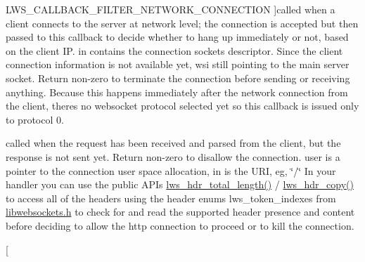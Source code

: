 \begin{Desc}
\begin{description}
{L\+W\+S\+\_\+\+C\+A\+L\+L\+B\+A\+C\+K\+\_\+\+F\+I\+L\+T\+E\+R\+\_\+\+N\+E\+T\+W\+O\+R\+K\+\_\+\+C\+O\+N\+N\+E\+C\+T\+I\+ON\hypertarget{group__usercb_ggad62860e19975ba4c4af401c3cdb6abf7a026502768778b8d79d62dd0fe4375fc6}{}\label{group__usercb_ggad62860e19975ba4c4af401c3cdb6abf7a026502768778b8d79d62dd0fe4375fc6}
}]called when a client connects to the server at network level; the connection is accepted but then passed to this callback to decide whether to hang up immediately or not, based on the client IP. in contains the connection socket\textquotesingle{}s descriptor. Since the client connection information is not available yet, wsi still pointing to the main server socket. Return non-\/zero to terminate the connection before sending or receiving anything. Because this happens immediately after the network connection from the client, there\textquotesingle{}s no websocket protocol selected yet so this callback is issued only to protocol 0. \item[{\em 
L\+W\+S\+\_\+\+C\+A\+L\+L\+B\+A\+C\+K\+\_\+\+F\+I\+L\+T\+E\+R\+\_\+\+H\+T\+T\+P\+\_\+\+C\+O\+N\+N\+E\+C\+T\+I\+ON\hypertarget{group__usercb_ggad62860e19975ba4c4af401c3cdb6abf7a75199176c82c1a56e4a6bbf1cc30c12c}{}\label{group__usercb_ggad62860e19975ba4c4af401c3cdb6abf7a75199176c82c1a56e4a6bbf1cc30c12c}
}]called when the request has been received and parsed from the client, but the response is not sent yet. Return non-\/zero to disallow the connection. user is a pointer to the connection user space allocation, in is the U\+RI, eg, \char`\"{}/\char`\"{} In your handler you can use the public A\+P\+Is \hyperlink{group__HTTP-headers-read_ga8ade0e1ffb0da7e62b989d8d867bf6c8}{lws\+\_\+hdr\+\_\+total\+\_\+length()} / \hyperlink{group__HTTP-headers-read_ga6ce6aa1c0155ea42b7708bed271d1c77}{lws\+\_\+hdr\+\_\+copy()} to access all of the headers using the header enums lws\+\_\+token\+\_\+indexes from \hyperlink{libwebsockets_8h}{libwebsockets.\+h} to check for and read the supported header presence and content before deciding to allow the http connection to proceed or to kill the connection. \item[{\em 
}
\end{description}
\end{Desc}

